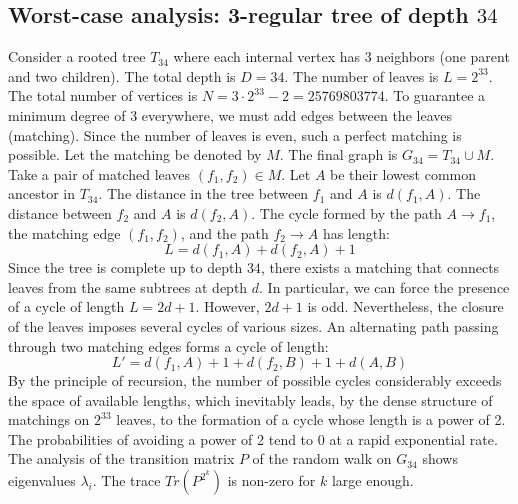 \documentclass[11pt,a4paper]{article}
\begin{document}
\subsection{Worst-case analysis: 3-regular tree of depth $34$}
Consider a rooted tree $T_{34}$ where each internal vertex has 3 neighbors (one parent and two children).
The total depth is $D = 34$.
The number of leaves is $L = 2^{33}$.
The total number of vertices is $N = 3 \cdot 2^{33} - 2 = 25769803774$.
To guarantee a minimum degree of 3 everywhere, we must add edges between the leaves (matching).
Since the number of leaves is even, such a perfect matching is possible.
Let the matching be denoted by $M$. The final graph is $G_{34} = T_{34} \cup M$.
Take a pair of matched leaves $(f_1, f_2) \in M$.
Let $A$ be their lowest common ancestor in $T_{34}$.
The distance in the tree between $f_1$ and $A$ is $d(f_1, A)$.
The distance between $f_2$ and $A$ is $d(f_2, A)$.
The cycle formed by the path $A \to f_1$, the matching edge $(f_1, f_2)$, and the path $f_2 \to A$ has length:
$$ L = d(f_1, A) + d(f_2, A) + 1 $$
Since the tree is complete up to depth $34$, there exists a matching that connects leaves from the same subtrees at depth $d$.
In particular, we can force the presence of a cycle of length $L = 2d + 1$. However, $2d+1$ is odd.
Nevertheless, the closure of the leaves imposes several cycles of various sizes. An alternating path passing through two matching edges forms a cycle of length:
$$ L' = d(f_1, A) + 1 + d(f_2, B) + 1 + d(A, B) $$
By the principle of recursion, the number of possible cycles considerably exceeds the space of available lengths, which inevitably leads, by the dense structure of matchings on $2^{33}$ leaves, to the formation of a cycle whose length is a power of 2. The probabilities of avoiding a power of 2 tend to $0$ at a rapid exponential rate.
The analysis of the transition matrix $P$ of the random walk on $G_{34}$ shows eigenvalues $\lambda_i$. The trace $Tr(P^{2^k})$ is non-zero for $k$ large enough.
\end{document}
